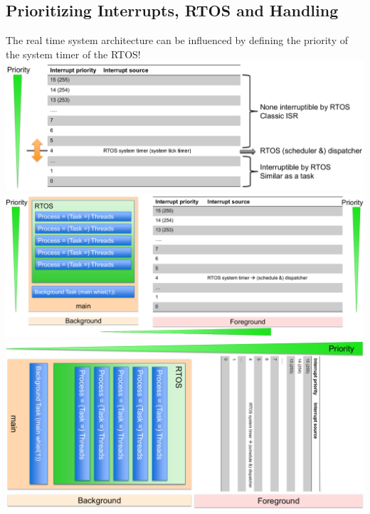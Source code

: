 \subsection{Prioritizing Interrupts, RTOS and Handling}
The real time system architecture can be influenced by defining the priority of the system timer of the RTOS!
\includegraphics[width=\textwidth]{images/DesignStrategy/prio_interrupts.png}
\includegraphics[width=\textwidth]{images/DesignStrategy/prio_interrupts_rtos_handling.png}
\includegraphics[width=\textwidth]{images/DesignStrategy/prio_interrupts_rtos_background.png}